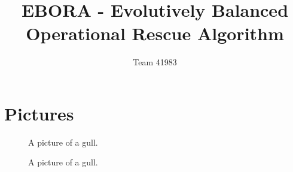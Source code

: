 \documentclass[12pt]{article}
\title{EBORA - Evolutively Balanced Operational Rescue Algorithm}
\author{Team 41983}
\date{}                                           %
\begin{document}
\setlength{\parindent}{0cm}

\section{Pictures}

\begin{figure}[h!]
	\begin{center}
	\end{center}
	\caption{A picture of a gull.}
\end{figure}

\begin{figure}[h!]
	\begin{center}
	\end{center}
	\caption{A picture of a gull.}
\end{figure}
\end{document}
